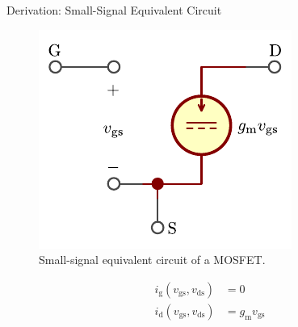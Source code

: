 \begin{frame}{Derivation: Small-Signal Equivalent Circuit}
    \begin{figure}
        \centering
        \includegraphics{../assets/small_signal.pdf}
        \caption{Small-signal equivalent circuit of a MOSFET.}
        \label{fig:mosfet_small_signal_model}
    \end{figure}
    \begin{align*}
        i_{\mathrm{g}}(v_{\mathrm{gs}}, v_{\mathrm{ds}}) &= 0 \\
        i_{\mathrm{d}}(v_{\mathrm{gs}}, v_{\mathrm{ds}}) &= g_{\mathrm{m}}v_{\mathrm{gs}}
    \end{align*}
\end{frame}
